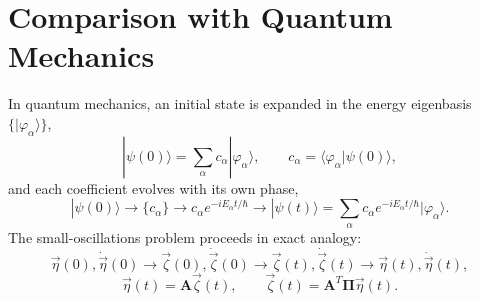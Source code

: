 \documentclass[11pt]{article}
\newcommand{\bA}{\mathbf{A}}
\newcommand{\bPi}{\bm{\Pi}}
\begin{document}
\section{Comparison with Quantum Mechanics}

In quantum mechanics, an initial state is expanded in the energy eigenbasis $\{|\varphi_\alpha\rangle\}$,
\begin{equation}
|\psi(0)\rangle = \sum_\alpha c_\alpha|\varphi_\alpha\rangle, \qquad c_\alpha = \langle\varphi_\alpha|\psi(0)\rangle,
\end{equation}
and each coefficient evolves with its own phase,
\begin{equation}
|\psi(0)\rangle \to \{c_\alpha\} \to c_\alpha e^{-iE_\alpha t/\hbar} \to |\psi(t)\rangle = \sum_\alpha c_\alpha e^{-iE_\alpha t/\hbar}|\varphi_\alpha\rangle.
\end{equation}
The small-oscillations problem proceeds in exact analogy:
\begin{equation}
\vec\eta(0),\dot{\vec\eta}(0) \longrightarrow \vec\zeta(0),\dot{\vec\zeta}(0) \longrightarrow \vec\zeta(t),\dot{\vec\zeta}(t) \longrightarrow \vec\eta(t),\dot{\vec\eta}(t),
\end{equation}
\begin{equation}
\vec\eta(t) = \bA\vec\zeta(t), \qquad \vec\zeta(t) = \bA^T\bPi\vec\eta(t).
\end{equation}
\end{document}
